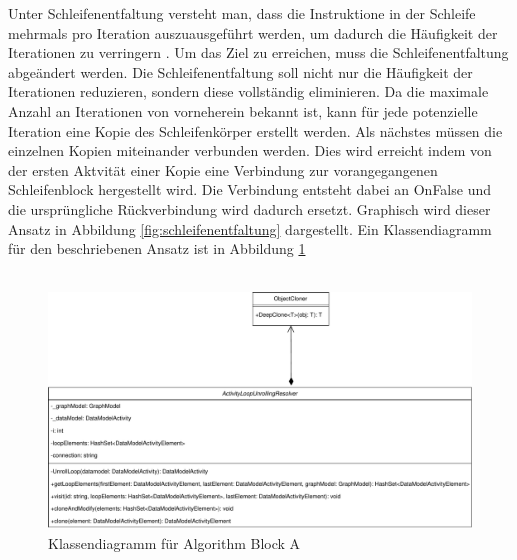     \noindent
    Unter Schleifenentfaltung versteht man, dass die Instruktione in der Schleife mehrmals pro Iteration auszuausgeführt werden, um dadurch die Häufigkeit der Iterationen zu verringern \cite{9}.
    Um das Ziel zu erreichen, muss die Schleifenentfaltung abgeändert werden.
    Die Schleifenentfaltung soll nicht nur die Häufigkeit der Iterationen reduzieren, sondern diese vollständig eliminieren.
    Da die maximale Anzahl an Iterationen von vorneherein bekannt ist, kann für jede potenzielle Iteration eine Kopie des Schleifenkörper erstellt werden. 
    Als nächstes müssen die einzelnen Kopien miteinander verbunden werden.
    Dies wird erreicht indem von der ersten Aktvität einer Kopie eine Verbindung zur vorangegangenen Schleifenblock hergestellt wird.
    Die Verbindung entsteht dabei an OnFalse und die ursprüngliche Rückverbindung wird dadurch ersetzt.
    Graphisch wird dieser Ansatz in Abbildung \cref{fig:schleifenentfaltung} dargestellt.
    Ein Klassendiagramm für den beschriebenen Ansatz ist in Abbildung \cref{fig:klassendiagramm-blocka}\\
    \\
    \begin{figure}[H]
        \centering    
        \includegraphics[width=\textwidth]{./images/UnbenanntesDiagramm.pdf}
        \caption{Klassendiagramm für Algorithm Block A}
        \label{fig:klassendiagramm-blocka}
    \end{figure}
    \noindent
